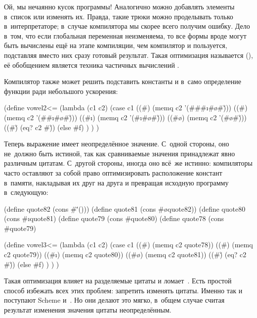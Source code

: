 Ой, мы нечаянно кусок программы! Аналогично можно добавлять элементы в~список
 или изменять их. Правда, такие трюки можно проделывать только
в~интерпретаторе; в~случае компилятора мы скорее всего получим ошибку. Дело
в~том, что если глобальная переменная  неизменяема, то все формы
вроде  могут быть вычислены ещё на
этапе компиляции, чем компилятор и пользуется, подставляя вместо них сразу
готовый результат. Такая оптимизация называется 
(), её обобщением является техника частичных
вычислений \cite{jgs93}.

Компилятор также может решить подставить константы и в~само определение функции
 ради небольшого ускорения:

\begin{code:lisp}
(define vowel2<=
  (lambda (c1 c2)
    (case c1
      ((#\a) (memq c2 '(#\a #\e #\i #\o #\u)))
      ((#\e) (memq c2 '(#\e #\i #\o #\u)))
      ((#\i) (memq c2 '(#\i #\o #\u)))
      ((#\o) (memq c2 '(#\o #\u)))
      ((#\u) (eq? c2 #\u))
      (else  #f) ) ) )
\end{code:lisp}

Теперь выражение  имеет неопределённое значение. С~одной стороны,
оно не~должно быть истиной, так как сравниваемые значения принадлежат явно
различным цитатам. С~другой стороны, иногда оно всё~же истинно: компиляторы
часто оставляют за собой право оптимизировать расположение констант в~памяти,
накладывая их друг на друга и превращая исходную программу в~следующую:

\begin{code:lisp}
(define quote82 (cons #\u '()))
(define quote81 (cons #\o quote82))
(define quote80 (cons #\i quote81)
(define quote79 (cons #\e quote80)
(define quote78 (cons #\a quote79)

(define vowel3<=
  (lambda (c1 c2)
    (case c1
      ((#\a) (memq c2 quote78))
      ((#\e) (memq c2 quote79))
      ((#\i) (memq c2 quote80))
      ((#\o) (memq c2 quote81))
      ((#\u) (eq? c2 #\u))
      (else  #f) ) ) )
\end{code:lisp}

Такая оптимизация влияет на разделяемые цитаты и ломает~. Есть простой
способ избежать всех этих проблем: запретить изменять цитаты. Именно так и
поступают Scheme и~{\CommonLisp}. Но они делают это мягко, в~общем случае считая
результат изменения значения цитаты неопределённым.

